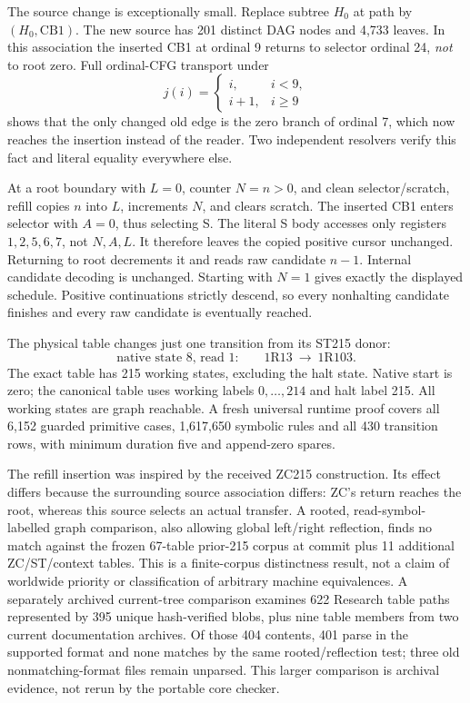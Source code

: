 \documentclass[11pt]{article}
\newcommand{\file}[1]{{\small\path{#1}}}
\begin{document}
The source change is exceptionally small. Replace subtree $H_0$ at path \file{0000111} by $(H_0,\mathrm{CB}1)$. The new source has 201 distinct DAG nodes and 4,733 leaves. In this association the inserted CB1 at ordinal 9 returns to selector ordinal 24, \emph{not} to root zero. Full ordinal-CFG transport under
\[
 j(i)=\begin{cases}i,&i<9,\\i+1,&i\ge9\end{cases}
\]
shows that the only changed old edge is the zero branch of ordinal 7, which now reaches the insertion instead of the reader. Two independent resolvers verify this fact and literal equality everywhere else.

At a root boundary with $L=0$, counter $N=n>0$, and clean selector/scratch, refill copies $n$ into $L$, increments $N$, and clears scratch. The inserted CB1 enters selector with $A=0$, thus selecting S. The literal S body accesses only registers $1,2,5,6,7$, not $N,A,L$. It therefore leaves the copied positive cursor unchanged. Returning to root decrements it and reads raw candidate $n-1$. Internal candidate decoding is unchanged. Starting with $N=1$ gives exactly the displayed schedule. Positive continuations strictly descend, so every nonhalting candidate finishes and every raw candidate is eventually reached.

The physical table changes just one transition from its ST215 donor:
\[
 \text{native state 8, read 1:}\qquad 1\mathrm{R}13\ \longrightarrow\ 1\mathrm{R}103.
\]
The exact table has 215 working states, excluding the halt state. Native start is zero; the canonical table uses working labels $0,\ldots,214$ and halt label 215. All working states are graph reachable. A fresh universal runtime proof covers all 6,152 guarded primitive cases, 1,617,650 symbolic rules and all 430 transition rows, with minimum duration five and append-zero spares.

The refill insertion was inspired by the received ZC215 construction. Its effect differs because the surrounding source association differs: ZC's return reaches the root, whereas this source selects an actual transfer. A rooted, read-symbol-labelled graph comparison, also allowing global left/right reflection, finds no match against the frozen 67-table prior-215 corpus at commit \file{29e2cc4c557c04d3358e41e566bd7c582844ff4e} plus 11 additional ZC/ST/context tables. This is a finite-corpus distinctness result, not a claim of worldwide priority or classification of arbitrary machine equivalences. A separately archived current-tree comparison examines 622 Research table paths represented by 395 unique hash-verified blobs, plus nine table members from two current documentation archives. Of those 404 contents, 401 parse in the supported format and none matches by the same rooted/reflection test; three old nonmatching-format files remain unparsed. This larger comparison is archival evidence, not rerun by the portable core checker.
\end{document}
